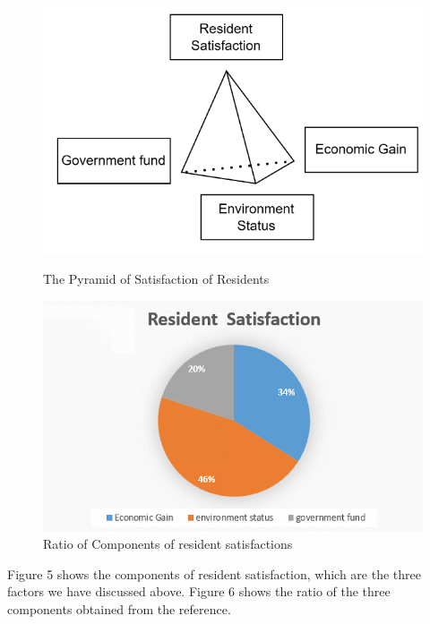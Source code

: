 \documentclass[UTF8]{mcmthesis}
\begin{document}
        \begin{figure}[htbp]
            \centering
            \begin{minipage}{0.45\textwidth}
                \centering
                \includegraphics[width=\textwidth]{pyramid.png}
                \caption{The Pyramid of Satisfaction of Residents}
            \end{minipage}\hfill
            \begin{minipage}{0.45\textwidth}
                \centering
                \includegraphics[width=\textwidth]{circle.png}
                \caption{Ratio of Components of resident satisfactions}
            \end{minipage}
        \end{figure}

        Figure 5 shows the components of resident satisfaction, which are the three factors we have discussed above. Figure 6 shows the ratio of the three components obtained from the reference\cite{Cottrell}.
\end{document}
